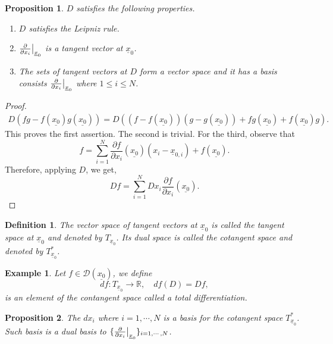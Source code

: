 \documentclass{article}
\newtheorem{proposition}{Proposition}[section]
\newtheorem{definition}{Definition}[section]
\newtheorem{example}{Example}[section]
\newcommand{\R}[0]{\mathbb{R}}
\newcommand{\pd}[2]{{\frac {\partial#1} {\partial#2}}}
\begin{document}
\begin{proposition}
  $D$ satisfies the following properties.
  \begin{enumerate}
    \item $D$ satisfies the Leipniz rule.
    \item $\pd{}{x_i}\big{|}_{\underline{x}_0}$ is a tangent vector at $\underline{x}_0$.
    \item The sets of tangent vectors at $D$ form a vector space and it has a basis consists $\pd{}{x_i}\big{|}_{\underline{x}_0}$ where $1\leq i\leq N$.
  \end{enumerate}
\end{proposition}

\begin{proof}
  \begin{align*}
    D(fg-f(\underline{x_0})g(\underline{x_0})) = D((f-f(\underline{x_0}))(g-g(\underline{x_0}))+fg(\underline{x_0})+f(\underline{x_0})g).
  \end{align*}
  This proves the first assertion. The second is trivial. For the third, observe that 
  \begin{equation*}
    f = \sum_{i=1}^N \pd{f}{x_i}(\underline{x_0})(x_i-\underline{x}_{0,i})+f(\underline{x_0}).
  \end{equation*}
  Therefore, applying $D$, we get,
  \begin{equation*}
    Df = \sum_{i=1}^N Dx_i \pd{f}{x_i}(\underline{x_0}).
  \end{equation*}
\end{proof}

\begin{definition}
  The vector space of tangent vectors at $\underline{x}_0$ is called the tangent space at $\underline{x}_0$ and denoted by $T_{\underline{x}_0}$. Its dual space
  is called the cotangent space and denoted by $T_{\underline{x}_0}^*$. 
\end{definition}

\begin{example}
  Let $f\in\mathcal{D}(\underline{x_0})$, we define 
  \begin{equation*}
    df:T_{\underline{x}_0}\to \R,\quad df(D) = Df,
  \end{equation*}
  is an element of the contangent space called a total differentiation.
\end{example}

\begin{proposition}
  The $dx_i$ where $i=1,\cdots, N$ is a basis for the cotangent space $T^*_{\underline{x}_0}$. Such basis is a dual basis to $\{\pd{}{x_i}\big{|}_{\underline{x}_0}\}_{i=1,\cdots,N}$.
\end{proposition}
\end{document}
